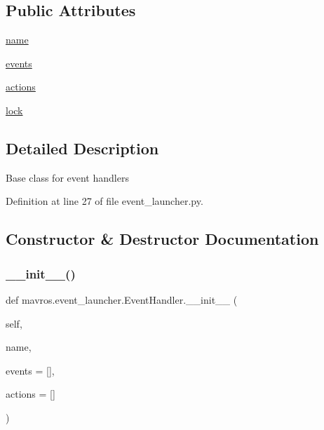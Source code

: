 \subsection*{Public Attributes}
\begin{DoxyCompactItemize}
\item 
\mbox{\hyperlink{classmavros_1_1event__launcher_1_1EventHandler_a09c331d1fc6308e8439779f0e15b83c2}{name}}
\item 
\mbox{\hyperlink{classmavros_1_1event__launcher_1_1EventHandler_ab47ae1dad36ee9e1925ccacda87475d9}{events}}
\item 
\mbox{\hyperlink{classmavros_1_1event__launcher_1_1EventHandler_a9b4f8bcde66b078510a28ed6c10c683b}{actions}}
\item 
\mbox{\hyperlink{classmavros_1_1event__launcher_1_1EventHandler_a435597d6bfff6d9fb8c30b2f19e3bab9}{lock}}
\end{DoxyCompactItemize}


\subsection{Detailed Description}
\begin{DoxyVerb}Base class for event handlers
\end{DoxyVerb}
 

Definition at line 27 of file event\+\_\+launcher.\+py.



\subsection{Constructor \& Destructor Documentation}
\mbox{\label{classmavros_1_1event__launcher_1_1EventHandler_a77e6da51e2d05f00f74d32167be47ba5}} 
\subsubsection{\texorpdfstring{\_\_init\_\_()}{\_\_init\_\_()}}
{\footnotesize\ttfamily def mavros.\+event\+\_\+launcher.\+Event\+Handler.\+\_\+\+\_\+init\+\_\+\+\_\+ (\begin{DoxyParamCaption}\item[{}]{self,  }\item[{}]{name,  }\item[{}]{events = {\ttfamily \mbox{[}\mbox{]}},  }\item[{}]{actions = {\ttfamily \mbox{[}\mbox{]}} }\end{DoxyParamCaption})}



